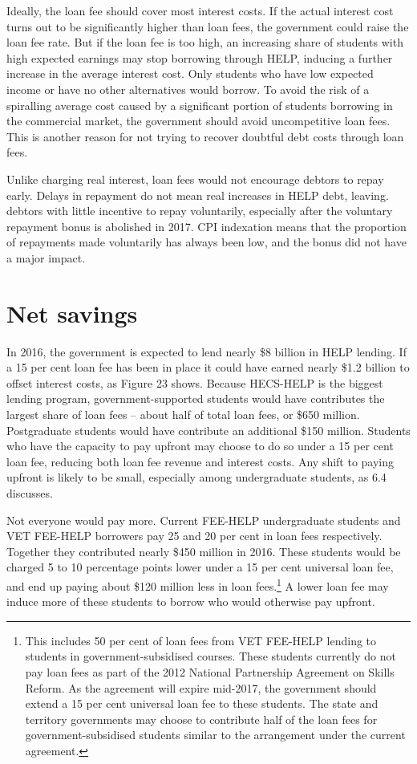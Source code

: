\documentclass[embargoed]{grattan}
\begin{document}
Ideally, the loan fee should cover most interest costs. If the actual interest cost turns out to be significantly higher than loan fees, the government could raise the loan fee rate. But if the loan fee is too high, an increasing share of students with high expected earnings may stop borrowing through HELP, inducing a further increase in the average interest cost. Only students who have low expected income or have no other alternatives would borrow. To avoid the risk of a spiralling average cost caused by a significant portion of students borrowing in the commercial market, the government should avoid uncompetitive loan fees. This is another reason for not trying to recover doubtful debt costs through loan fees.

Unlike charging real interest, loan fees would not encourage debtors to repay early. Delays in repayment do not mean real increases in HELP debt, leaving. debtors with little incentive to repay voluntarily, especially after the voluntary repayment bonus is abolished in 2017. CPI indexation means that the proportion of repayments made voluntarily has always been low, and the bonus did not have a major impact.

\section{Net savings}\label{net-savings}

In 2016, the government is expected to lend nearly \$8 billion in HELP lending. If a 15 per cent loan fee has been in place it could have earned nearly \$1.2 billion to offset interest costs, as Figure 23 shows. Because HECS-HELP is the biggest lending program, government-supported students would have contributes the largest share of loan fees -- about half of total loan fees, or \$650 million. Postgraduate students would have contribute an additional \$150 million. Students who have the capacity to pay upfront may choose to do so under a 15 per cent loan fee, reducing both loan fee revenue and interest costs. Any shift to paying upfront is likely to be small, especially among undergraduate students, as 6.4 discusses.

Not everyone would pay more. Current FEE-HELP undergraduate students and VET FEE-HELP borrowers pay 25 and 20 per cent in loan fees respectively. Together they contributed nearly \$450 million in 2016. These students would be charged 5 to 10 percentage points lower under a 15 per cent universal loan fee, and end up paying about \$120 million less in loan fees.\footnote{This includes 50 per cent of loan fees from VET FEE-HELP lending to students in government-subsidised courses. These students currently do not pay loan fees as part of the 2012 National Partnership Agreement on Skills Reform. As the agreement will expire mid-2017, the government should extend a 15 per cent universal loan fee to these students. The state and territory governments may choose to contribute half of the loan fees for government-subsidised students similar to the arrangement under the current agreement.} A lower loan fee may induce more of these students to borrow who would otherwise pay upfront.
\end{document}
